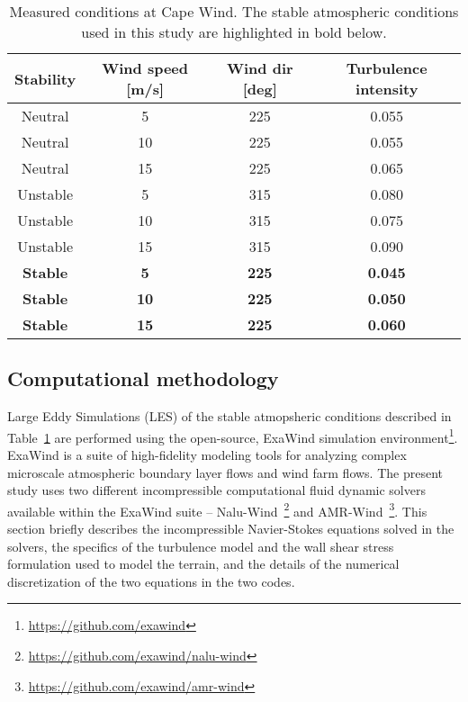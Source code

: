 \begin{table}
\caption{\label{tab:CapeWindMeasurements} Measured conditions at Cape
  Wind.  The stable atmospheric conditions used in this study are
  highlighted in bold below.} \centering
\begin{tabular}{cccc}
  \hline
  Stability    & Wind speed [m/s] & Wind dir [deg] & Turbulence intensity \\
  \hline
  Neutral      & 5                & 225            & 0.055           \\
  Neutral      & 10               & 225            & 0.055           \\
  Neutral      & 15               & 225            & 0.065           \\
  Unstable     & 5                & 315            & 0.080           \\
  Unstable     & 10               & 315            & 0.075           \\
  Unstable     & 15               & 315            & 0.090           \\
  \bf{Stable}  & \bf{5}           & \bf{225}       & \bf{0.045}      \\
  \bf{Stable}  & \bf{10}          & \bf{225}       & \bf{0.050}      \\
  \bf{Stable}  & \bf{15}          & \bf{225}       & \bf{0.060}      \\
\hline
\end{tabular}
\end{table}


\subsection{Computational methodology}

Large Eddy Simulations (LES) of the stable atmopsheric conditions described in
Table~\ref{tab:CapeWindMeasurements} are performed using the open-source,
ExaWind simulation environment\footnote{\url{https://github.com/exawind}}.
ExaWind is a suite of high-fidelity modeling tools for analyzing complex
microscale atmospheric boundary layer flows and wind farm flows. The present
study uses two different incompressible computational fluid dynamic solvers
available within the ExaWind suite --
Nalu-Wind~\footnote{\url{https://github.com/exawind/nalu-wind}} and
AMR-Wind~\footnote{\url{https://github.com/exawind/amr-wind}}. This section
briefly describes the incompressible Navier-Stokes equations solved in the
solvers, the specifics of the turbulence model and the wall shear stress
formulation used to model the terrain, and the details of the numerical
discretization of the two equations in the two codes.

